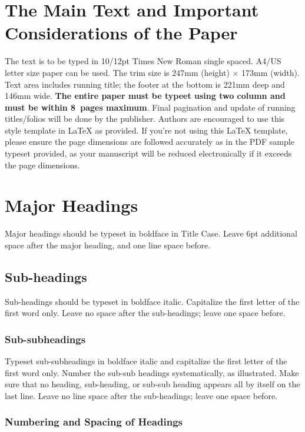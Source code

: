 \documentclass[twocolumn]{rps-esrel2026}
\begin{document}
\section{The Main Text and Important Considerations of the Paper} The text is to be typed in 10/12pt Times New Roman single spaced.  A4/US
letter size paper can be used.  The trim size is 247mm (height)
$\times$ 173mm (width).  Text area includes running title; the footer at the bottom
is 221mm deep and 146mm wide. {\bf The entire paper must be typeet using two column and must be within 8~pages maximum}. Final pagination and update of running titles/folios will be done
by the publisher.   Authors are encouraged to use this style template in LaTeX as provided. If you're not using this LaTeX template, please
ensure the page dimensions are followed accurately as in the PDF
sample typeset provided, as your manuscript will be reduced
electronically if it exceeds the page dimensions. \cite{sample1}

\section{Major Headings}

Major headings should be typeset in boldface in Title Case.  Leave
6pt additional space after the major heading, and one line space
before. \cite{sample2}

\subsection{Sub-headings}

Sub-headings should be typeset in boldface italic. Capitalize the first letter of the first word only.  Leave no space after the sub-headings; leave one space
before.


\subsubsection{Sub-subheadings}

Typeset sub-subheadings in boldface italic and capitalize the first letter of the first word only. Number the sub-sub headings systematically, as illustrated.
Make sure that no heading, sub-heading, or sub-sub heading appears all by itself on the last line. Leave no line space after the sub-headings; leave one space
before.

\subsubsection{Numbering and Spacing of Headings}
\end{document}
